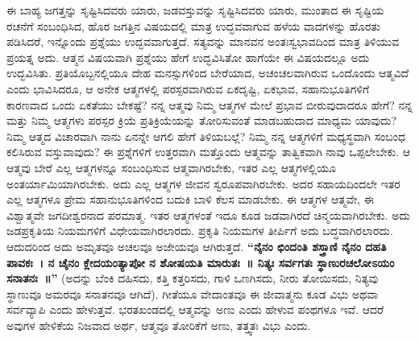 ಈ ಬಾಹ್ಯ ಜಗತ್ತನ್ನು ಸೃಷ್ಟಿಸಿದವರು ಯಾರು, ಜಡವಸ್ತುವನ್ನು ಸೃಷ್ಟಿಸಿದವರು ಯಾರು, ಮುಂತಾದ ಈ ಸೃಷ್ಟಿಯ ರಚನೆಗೆ ಸಂಬಂಧಿಸಿದ, ಹೊರ ಜಗತ್ತಿನ ವಿಷಯದಲ್ಲಿ ಮಾತ್ರ ಉದ್ಭವವಾಗುವ ಹಳೆಯ ವಾದಗಳನ್ನು ಹೊರತು ಪಡಿಸಿದರೆ, ಇನ್ನೊಂದು ಪ್ರಶ್ನೆಯು ಉದ್ಭವವಾಗುತ್ತದೆ. ಸತ್ಯವನ್ನು ಮಾನವನ ಅಂತಃಸ್ವಭಾವದಿಂದ ಮಾತ್ರ ತಿಳಿಯುವ ಪ್ರಯತ್ನ ಅದು. ಆತ್ಮನ ವಿಷಯವಾಗಿ ಪ್ರಶ್ನೆಯು ಹೇಗೆ ಉದ್ಭವಿಸಿತೋ ಹಾಗೆಯೇ ಈ ವಿಷಯದಲ್ಲೂ ಅದು ಉದ್ಭವಿಸಿತು. ಪ್ರತಿಯೊಬ್ಬನಲ್ಲಿಯೂ ದೇಹ ಮನಸ್ಸುಗಳಿಂದ ಬೇರೆಯಾದ, ಅಚಂಚಲವಾಗಿರುವ ಒಂದೊಂದು ಆತ್ಮವಿದೆ ಎಂದು ಭಾವಿಸಿದರೂ, ಆ ಅನೇಕ ಆತ್ಮಗಳಲ್ಲಿ ಪರಸ್ಪರವಾಗಿರುವ ಏಕದೃಷ್ಟಿ, ಏಕಭಾವ, ಸಹಾನುಭೂತಿಗಳಿಗೆ ಕಾರಣವಾದ ಒಂದು ಏಕತೆಯು ಬೇಕಷ್ಟೆ? ನನ್ನ ಆತ್ಮವು ನಿಮ್ಮ ಆತ್ಮಗಳ ಮೇಲೆ ಪ್ರಭಾವ ಬೀರುವುದಾದರೂ ಹೇಗೆ? ನನ್ನ ಮತ್ತು ನಿಮ್ಮ ಆತ್ಮಗಳು ಪರಸ್ಪರ ಕ್ರಿಯೆ ಪ್ರತಿಕ್ರಿಯೆಯನ್ನು ತೋರಿಸುವಂತೆ ಮಾಡಬಹುದಾದ ಮಾಧ್ಯಮ ಯಾವುದು? ನಿಮ್ಮ ಆತ್ಮದ ವಿಚಾರವಾಗಿ ನಾನು ಏನನ್ನೇ ಆಗಲಿ ಹೇಗೆ ತಿಳಿಯಬಲ್ಲೆ? ನಿಮ್ಮ ನನ್ನ ಆತ್ಮಗಳಿಗೆ ಮಧ್ಯಸ್ಥವಾಗಿ ಸಂಬಂಧ ಕಲಿಸಿರುವ ವಸ್ತುವಾವುದು? ಈ ಪ್ರಶ್ನೆಗಳಿಗೆ ಉತ್ತರವಾಗಿ ಮತ್ತೊಂದು ಆತ್ಮವನ್ನು ತಾತ್ವಿಕವಾಗಿ ನಾವು ಒಪ್ಪಲೇಬೇಕು. ಆ ಆತ್ಮವು ಬೇರೆ ಎಲ್ಲ ಆತ್ಮಗಳನ್ನೂ ಸಂಬಂಧಿಸುವ ಆತ್ಮವಾಗಿರಬೇಕು, ಇತರ ಎಲ್ಲ ಆತ್ಮಗಳಲ್ಲಿಯೂ ಅಂತರ್ಯಾಮಿಯಾಗಿರಬೇಕು. ಅದು ಎಲ್ಲ ಆತ್ಮಗಳ ಜೀವನ ಸ್ವರೂಪವಾಗಿರಬೇಕು. ಅದರ ಸಹಾಯದಿಂದಲೇ ಇತರ ಎಲ್ಲ ಆತ್ಮಗಳೂ ಪ್ರೇಮ ಸಹಾನುಭೂತಿಗಳಿಂದ ಬದುಕಿ ಬಾಳಿ ಕೆಲಸ ಮಾಡಬೇಕು. ಈ ಆತ್ಮಗಳ ಆತ್ಮವೇ, ಈ ವಿಶ್ವಾತ್ಮವೇ ಜಗದೀಶ್ವರನಾದ ಪರಮಾತ್ಮ. ಇತರ ಆತ್ಮಗಳಂತೆ ಇದೂ ಕೂಡ ಜಡವಾಗಿರದೆ ಚಿನ್ಮಯವಾಗಿರಬೇಕು. ಅದು ಜಡಪ್ರಕೃತಿಯ ನಿಯಮಗಳಿಗೆ ವಿಧೇಯವಾಗಿರಲಾರದು. ಪ್ರಕೃತಿ ನಿಯಮಗಳ ತೀರ್ಪಿಗೆ ಅದು ಬದ್ಧವಾಗಿರಲಾರದು. ಆದುದರಿಂದ ಅದು ಅಮೃತವೂ ಅಚಲವೂ ಅಜೇಯವೂ ಆಗಿರುತ್ತದೆ. \textbf{“ನೈನಂ ಛಿಂದಂತಿ ಶಸ್ತ್ರಾಣಿ ನೈನಂ ದಹತಿ ಪಾವಕಃ~। ನ ಚೈನಂ ಕ್ಲೇದಯಂತ್ಯಾಪೋ ನ ಶೋಷಯತಿ ಮಾರುತಃ~॥ ನಿತ್ಯಃ ಸರ್ವಗತಃ ಸ್ಥಾಣುರಚಲೋಽಯಂ ಸನಾತನಃ~॥”} (ಅದನ್ನು ಬೆಂಕಿ ದಹಿಸದು, ಕತ್ತಿ ಕತ್ತರಿಸದು, ಗಾಳಿ ಒಣಗಿಸದು, ನೀರು ತೋಯಿಸದು, ನಿತ್ಯವು ಸ್ಥಾಣುವೂ ಅಮರವೂ ಸನಾತನವೂ ಆಗಿದೆ). ಗೀತೆಯೂ ವೇದಾಂತವೂ ಈ ಜೀವಾತ್ಮನು ಕೂಡ ವಿಭು ಅಥವಾ ಸರ್ವವ್ಯಾಪಿ ಎಂದು ಹೇಳುತ್ತವೆ. ಭರತಖಂಡದಲ್ಲಿ ಆತ್ಮವನ್ನು ಅಣು ಎಂದು ಹೇಳುವ ಪಂಥಗಳೂ ಇವೆ. ಆದರೆ ಅವುಗಳ ಹೇಳಿಕೆಯ ನಿಜವಾದ ಅರ್ಥ, ಆತ್ಮವೂ ತೋರಿಕೆಗೆ ಅಣು, ತತ್ತ್ವತಃ ವಿಭು ಎಂದು.

